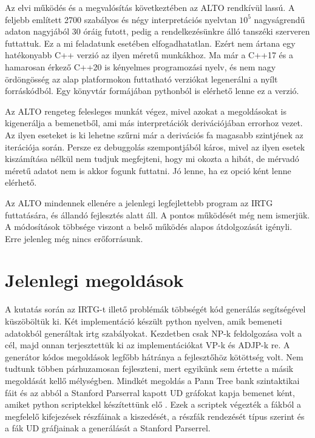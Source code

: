 Az elvi működés és a megvalósítás következtében az ALTO rendkívül lassú. A feljebb említett 2700 szabályos és négy interpretációs nyelvtan $10^5$ nagyságrendű adaton nagyjából 30 óráig futott, pedig a rendelkezésünkre álló tanszéki szerveren futtattuk. Ez a mi feladatunk esetében elfogadhatatlan. Ezért nem ártana egy hatékonyabb C++ verzió az ilyen méretű munkákhoz. Ma már a C++17 és a hamarosan érkező C++20 is kényelmes programozási nyelv, és nem nagy ördöngösség az alap platformokon futtatható verziókat legenerálni a nyílt forráskódból. Egy könyvtár formájában pythonból is elérhető lenne ez a verzió.

Az ALTO rengeteg felesleges munkát végez, mivel azokat a megoldásokat is kigenerálja a bemenetből, ami más interpretációk derivációjában errorhoz vezet. Az ilyen eseteket is ki lehetne szűrni már a derivációs fa magasabb szintjének az iterációja során. Persze ez debuggolás szempontjából káros, mivel az ilyen esetek kiszámítása nélkül nem tudjuk megfejteni, hogy mi okozta a hibát, de mérvadó méretű adatot nem is akkor fogunk futtatni. Jó lenne, ha ez opció ként lenne elérhető.

Az ALTO mindennek ellenére a jelenlegi legfejlettebb program az IRTG futtatására, és állandó fejlesztés alatt áll. A pontos működését még nem ismerjük. A módosítások többsége viszont a belső működés alapos átdolgozását igényli. Erre jelenleg még nincs erőforrásunk.

\section{Jelenlegi megoldások}
\label{sec:solutions}
A kutatás során az IRTG-t illető problémák többségét kód generálás segítségével küszöböltük ki. Két implementáció készült python nyelven, amik bemeneti adatokból generáltak irtg szabályokat. Kezdetben csak NP-k feldolgozása volt a cél, majd onnan terjesztettük ki az implementációkat VP-k és ADJP-k re. A generátor kódos megoldások legfőbb hátránya a fejlesztőhöz kötöttség volt. Nem tudtunk többen párhuzamosan fejleszteni, mert egyikünk sem értette a másik megoldását kellő mélységben.
Mindkét megoldás a Pann Tree bank szintaktikai fáit és az abból a Stanford Parserral kapott UD gráfokat kapja bemenet ként, amiket python scriptekkel készítettünk elő . Ezek a scriptek végezték a fákból a megfelelő kifejezések részfáinak a kiszedését, a részfák rendezését típus szerint és a fák UD gráfjainak a generálását a Stanford Parserrel.


